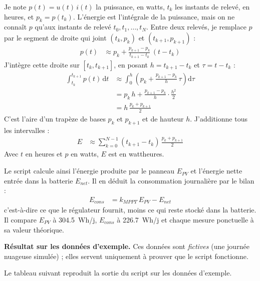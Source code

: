 \begin{demonstration}
Je note $p(t) = u(t)\, i(t)$ la puissance, en watts, $t_k$ les instants de relevé, en heures, et $p_k = p(t_k)$. L'énergie est l'intégrale de la puissance, mais on ne connaît $p$ qu'aux instants de relevé $t_0, t_1, \dots, t_N$. Entre deux relevés, je remplace $p$ par le segment de droite qui joint $(t_k, p_k)$ et $(t_{k+1}, p_{k+1})$ :
\begin{align*}
p(t) &\approx p_k + \frac{p_{k+1} - p_k}{t_{k+1} - t_k}\,(t - t_k)
\end{align*}
J'intègre cette droite sur $[t_k, t_{k+1}]$, en posant $h = t_{k+1} - t_k$ et $\tau = t - t_k$ :
\begin{align*}
\int_{t_k}^{t_{k+1}} p(t)\,\mathrm{d}t &\approx \int_{0}^{h}\left(p_k + \frac{p_{k+1} - p_k}{h}\,\tau\right)\mathrm{d}\tau\\
&= p_k\, h + \frac{p_{k+1} - p_k}{h}\cdot\frac{h^2}{2}\\
&= h\,\frac{p_k + p_{k+1}}{2}
\end{align*}
C'est l'aire d'un trapèze de bases $p_k$ et $p_{k+1}$ et de hauteur $h$. J'additionne tous les intervalles :
\begin{align*}
E &\approx \sum_{k=0}^{N-1} (t_{k+1} - t_k)\,\frac{p_k + p_{k+1}}{2}
\end{align*}
Avec $t$ en heures et $p$ en watts, $E$ est en wattheures.
\end{demonstration}

Le script calcule ainsi l'énergie produite par le panneau $E_{PV}$ et l'énergie nette entrée dans la batterie $E_{net}$. Il en déduit la consommation journalière par le bilan :
\begin{align*}
E_{cons} &= k_{MPPT}\, E_{PV} - E_{net}
\end{align*}
c'est-à-dire ce que le régulateur fournit, moins ce qui reste stocké dans la batterie. Il compare $E_{PV}$ à \qty{304,5}{Wh/j}, $E_{cons}$ à \qty{226,7}{Wh/j} et chaque mesure ponctuelle à sa valeur théorique.

\textbf{Résultat sur les données d'exemple.} Ces données sont \emph{fictives} (une journée nuageuse simulée) ; elles servent uniquement à prouver que le script fonctionne.

Le tableau suivant reproduit la sortie du script sur les données d'exemple.

